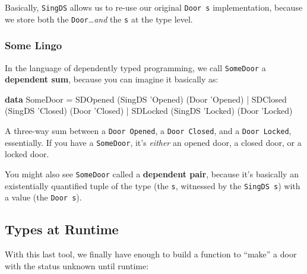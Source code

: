 \documentclass[]{article}
\newenvironment{Shaded}{}{}
\newcommand{\KeywordTok}[1]{\textcolor[rgb]{0.00,0.44,0.13}{\textbf{#1}}}
\newcommand{\DataTypeTok}[1]{\textcolor[rgb]{0.56,0.13,0.00}{#1}}
\newcommand{\CharTok}[1]{\textcolor[rgb]{0.25,0.44,0.63}{#1}}
\newcommand{\FunctionTok}[1]{\textcolor[rgb]{0.02,0.16,0.49}{#1}}
\newcommand{\NormalTok}[1]{#1}
\begin{document}
Basically, \texttt{SingDS} allows us to re-use our original \texttt{Door\ s}
implementation, because we store both the \texttt{Door}\ldots{}\emph{and} the
\texttt{s} at the type level.

\subsubsection{Some Lingo}\label{some-lingo}

In the language of dependently typed programming, we call \texttt{SomeDoor} a
\textbf{dependent sum}, because you can imagine it basically as:

\begin{Shaded}
\begin{Highlighting}[]
\KeywordTok{data} \DataTypeTok{SomeDoor} \FunctionTok{=} \DataTypeTok{SDOpened}\NormalTok{ (}\DataTypeTok{SingDS} \CharTok{'Opened) (Door '}\DataTypeTok{Opened}\NormalTok{)}
              \FunctionTok{|} \DataTypeTok{SDClosed}\NormalTok{ (}\DataTypeTok{SingDS} \CharTok{'Closed) (Door '}\DataTypeTok{Closed}\NormalTok{)}
              \FunctionTok{|} \DataTypeTok{SDLocked}\NormalTok{ (}\DataTypeTok{SingDS} \CharTok{'Locked) (Door '}\DataTypeTok{Locked}\NormalTok{)}
\end{Highlighting}
\end{Shaded}

A three-way sum between a \texttt{Door\ \textquotesingle{}Opened}, a
\texttt{Door\ \textquotesingle{}Closed}, and a
\texttt{Door\ \textquotesingle{}Locked}, essentially. If you have a
\texttt{SomeDoor}, it's \emph{either} an opened door, a closed door, or a locked
door.

You might also see \texttt{SomeDoor} called a \textbf{dependent pair}, because
it's basically an existentially quantified tuple of the type (the \texttt{s},
witnessed by the \texttt{SingDS\ s}) with a value (the \texttt{Door\ s}).

\subsection{Types at Runtime}\label{types-at-runtime}

With this last tool, we finally have enough to build a function to ``make'' a
door with the status unknown until runtime:
\end{document}
